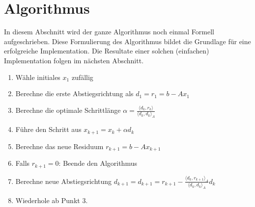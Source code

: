 \section{Algorithmus\label{cg:section:voraussetzungen}}

In diesem Abschnitt wird der ganze Algorithmus noch einmal Formell aufgeschrieben.
Diese Formulierung des Algorithmus bildet die Grundlage für eine erfolgreiche Implementation.
Die Resultate einer solchen (einfachen) Implementation folgen im nächsten Abschnitt.

\begin{enumerate}
	\item Wähle initiales $x_1$ zufällig
	\item Berechne die erste Abstiegsrichtung als $d_1 = r_1 =  b-Ax_1$
	\item Berechne die optimale Schrittlänge $\alpha	= 	\frac{\langle d_k , r_k \rangle}{\langle d_k , d_k \rangle_A}$ 
	\item Führe den Schritt aus $x_{k+1} = x_k + \alpha d_k$
	\item Berechne das neue Residuum $r_{k+1} = b-Ax_{k+1}$
	\item Falls $r_{k+1} = 0$: Beende den Algorithmus
	\item Berechne neue Abstiegsrichtung $d_{k+1} = d_{k+1}	= 	r_{k+1} - \frac{\langle d_k , r_{k+1} \rangle_A}{\langle d_k , d_k \rangle_A} d_k $
	\item Wiederhole ab Punkt 3.
\end{enumerate}